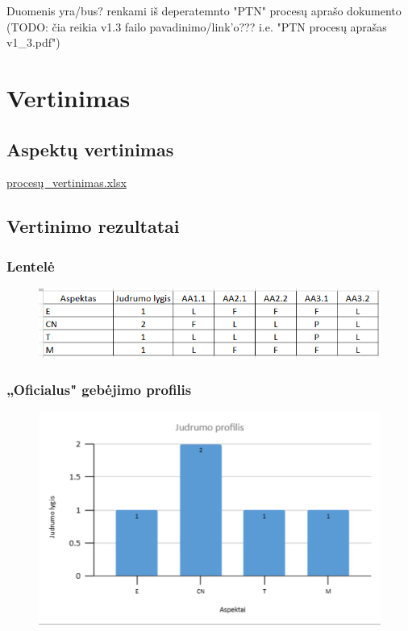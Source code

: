 \documentclass{article}
\begin{document}
Duomenis yra/bus? renkami iš deperatemnto "PTN" procesų aprašo dokumento (TODO: čia reikia v1.3 failo pavadinimo/link'o??? i.e. "PTN procesų aprašas v1\_3.pdf")

\section{Vertinimas}

\subsection{Aspektų vertinimas}

\href{https://docs.google.com/spreadsheets/d/1unX_xcZLEGHqQOMCuBBXYvVhYjChxpnq/edit?usp=share_link&ouid=113452949406463366361&rtpof=true&sd=true}{procesų\_vertinimas.xlsx}

\subsection{Vertinimo rezultatai}

\subsubsection{Lentelė}

\begin{figure}[H]%
    \centering
    \includegraphics[width=0.85\linewidth]{task-2/images/lentele.png}
\end{figure}

\subsubsection{„Oficialus" gebėjimo profilis}

\begin{figure}[H]%
    \centering
    \includegraphics[width=0.85\linewidth]{task-2/images/judrumo-profilis.png}
\end{figure}
\end{document}
